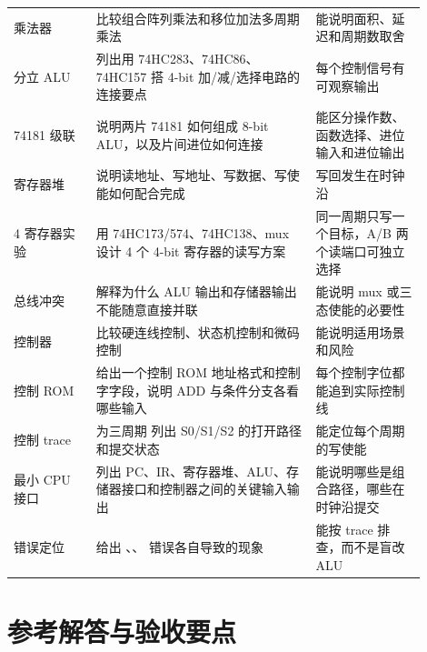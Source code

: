 \begin{longtable}{L{0.18\linewidth}L{0.48\linewidth}L{0.24\linewidth}}
乘法器 & 比较组合阵列乘法和移位加法多周期乘法 & 能说明面积、延迟和周期数取舍 \\
分立 ALU & 列出用 74HC283、74HC86、74HC157 搭 4-bit 加/减/选择电路的连接要点 & 每个控制信号有可观察输出 \\
74181 级联 & 说明两片 74181 如何组成 8-bit ALU，以及片间进位如何连接 & 能区分操作数、函数选择、进位输入和进位输出 \\
寄存器堆 & 说明读地址、写地址、写数据、写使能如何配合完成  & 写回发生在时钟沿 \\
4 寄存器实验 & 用 74HC173/574、74HC138、mux 设计 4 个 4-bit 寄存器的读写方案 & 同一周期只写一个目标，A/B 两个读端口可独立选择 \\
总线冲突 & 解释为什么 ALU 输出和存储器输出不能随意直接并联 & 能说明 mux 或三态使能的必要性 \\
控制器 & 比较硬连线控制、状态机控制和微码控制 & 能说明适用场景和风险 \\
控制 ROM & 给出一个控制 ROM 地址格式和控制字字段，说明 ADD 与条件分支各看哪些输入 & 每个控制字位都能追到实际控制线 \\
控制 trace & 为三周期  列出 S0/S1/S2 的打开路径和提交状态 & 能定位每个周期的写使能 \\
最小 CPU 接口 & 列出 PC、IR、寄存器堆、ALU、存储器接口和控制器之间的关键输入输出 & 能说明哪些是组合路径，哪些在时钟沿提交 \\
错误定位 & 给出 、、 错误各自导致的现象 & 能按 trace 排查，而不是盲改 ALU \\
\bottomrule
\end{longtable}

\section*{参考解答与验收要点}

